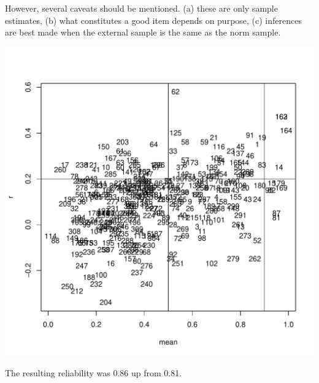 \documentclass[10pt,man]{apa6}\usepackage{graphicx, color}
\makeatletter
\def\maxwidth{ %
  \ifdim\Gin@nat@width>\linewidth
    \linewidth
  \else
    \Gin@nat@width
  \fi
}
\makeatother
\begin{document}
However, several caveats should be mentioned.
(a) these are only sample estimates,
(b) what constitutes a good item depends on purpose,
(c) inferences are best made when the external sample is the
 same as the norm sample.


\begin{Schunk}

\includegraphics[width=\maxwidth]{figure/listings-plot_mean_by_r} \end{Schunk}








The resulting reliability was 
0.86 up from
0.81.
\end{document}
